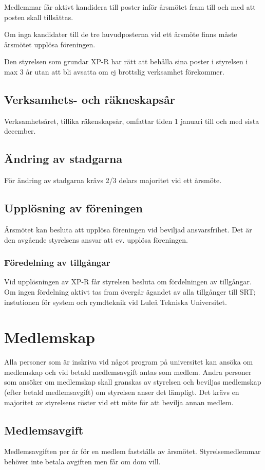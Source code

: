 \documentclass{article}
\begin{document}
Medlemmar får aktivt kandidera till poster inför årsmötet fram till och med att posten skall tillsättas.

Om inga kandidater till de tre huvudposterna vid ett årsmöte finns måste årsmötet upplösa föreningen.

Den styrelsen som grundar XP-R har rätt att behålla sina poster i styrelsen i max 3 år utan att bli avsatta om ej brottslig verksamhet förekommer.

\subsection{Verksamhets- och räkneskapsår}
Verksamhetsåret, tillika räkenskapsår, omfattar tiden 1 januari till och med sista december.

\subsection{Ändring av stadgarna}
För ändring av stadgarna krävs 2/3 delars majoritet vid ett årsmöte.

\subsection{Upplösning av föreningen}
Årsmötet kan besluta att upplösa föreningen vid beviljad ansvarsfrihet. Det är den avgående styrelsens ansvar att ev. upplösa föreningen.

\subsubsection{Föredelning av tillgångar}
Vid upplösningen av XP-R får styrelsen besluta om fördelningen av tillgångar. Om ingen fördelning aktivt tas fram övergår ägandet av alla tillgånger till SRT; instutionen för system och rymdteknik vid Luleå Tekniska Universitet.


\section{Medlemskap}
Alla personer som är inskriva vid något program på universitet kan ansöka om medlemskap och vid betald medlemsavgift antas som medlem. Andra personer som ansöker om medlemskap skall granskas av styrelsen och beviljas medlemskap (efter betald medlemsavgift) om styrelsen anser det lämpligt. Det krävs en majoritet av styrelsens röster vid ett möte för att bevilja annan medlem.
\subsection{Medlemsavgift}
Medlemsavgiften per år för en medlem fastställs av årsmötet. Styrelsemedlemmar behöver inte betala avgiften men får om dom vill.
\end{document}
